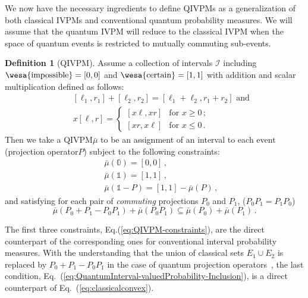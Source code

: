 \documentclass[english,reprint, aps, prl,superscriptaddress, showpacs,
showkeys, longbibliography, amsmath, amssymb]{revtex4-1}
\theoremstyle{plain}
\theoremstyle{definition}
\newtheorem{definition}[thm]{Definition}
\newcommand{\imposs}{{\text{\wesa{impossible}}}}
\newcommand{\necess}{{\text{\wesa{certain}}}}
\newcommand{\nb}{\nolinebreak[1] }
\begin{document}
We now have the necessary ingredients to define QIVPMs as a
generalization of both classical IVPMs and conventional quantum
probability measures. We will assume that the quantum IVPM will reduce to
the classical IVPM when the space of quantum events is restricted to
mutually commuting sub-events.

\begin{definition}[QIVPM]
  Assume a collection of intervals $\mathscr{I}$ including
  $\imposs=[0,0]$ and $\necess=[1,1]$ with addition and scalar
  multiplication defined as follows:
  \begin{subequations}\label{eq:interval-operations}
  \begin{eqnarray}
   &  & [\ell_{1},r_{1}]+[\ell_{2},r_{2}]=[\ell_{1}+\ell_{2},r_{1}+r_{2}]\textrm{ and}\\
   &  & x[\ell,r]=\begin{cases}
  [x\ell,xr] & \textrm{for }x\ge0\,;\\{}
  [xr,x\ell] & \textrm{for }x\le0\,.
  \end{cases}
  \end{eqnarray}
  \end{subequations}
  Then we take a QIVPM\nb$\bar{\mu}$ to be an assignment of an interval to each
  event (projection operator\nb$P$) subject to the following constraints:
  \begin{subequations}\label{eq:QIVPM-constraints}
  \begin{eqnarray}
   &  & \bar{\mu}(\mathbb{0})=\left[0,0\right]\,,\\
   &  & \bar{\mu}(\mathbb{1})=\left[1,1\right]\,,\\
   &  & \bar{\mu}\left(\mathbb{1}-P\right)=\left[1,1\right]-\bar{\mu}\left(P\right)\,,
  \end{eqnarray}
  \end{subequations}
  and satisfying for each pair of \emph{commuting} projections $P_0$ and $P_1$,
  ($P_0P_1=P_1P_0$)
\begin{equation}
\bar{\mu}\left(P_{0}+P_{1}-P_{0}P_{1}\right)+\bar{\mu}\left(P_{0}P_{1}\right)\subseteq\bar{\mu}\left(P_{0}\right)+\bar{\mu}\left(P_{1}\right)\,.
\label{eq:QuantumInterval-valuedProbability-Inclusion}
\end{equation}
\end{definition}
The first three constraints, Eq.\nb(\ref{eq:QIVPM-constraints}), are the direct
counterpart of the corresponding ones for conventional interval probability
measures.
With the understanding that the union of classical sets $E_1\cup E_2$ is replaced
by $P_0+P_1-P_0P_1$ in the case of quantum projection
operators~\cite{Griffiths2003}, the last condition, Eq.~(\ref{eq:QuantumInterval-valuedProbability-Inclusion}), is
a direct counterpart of Eq.~(\ref{eq:classicalconvex}).
\end{document}
